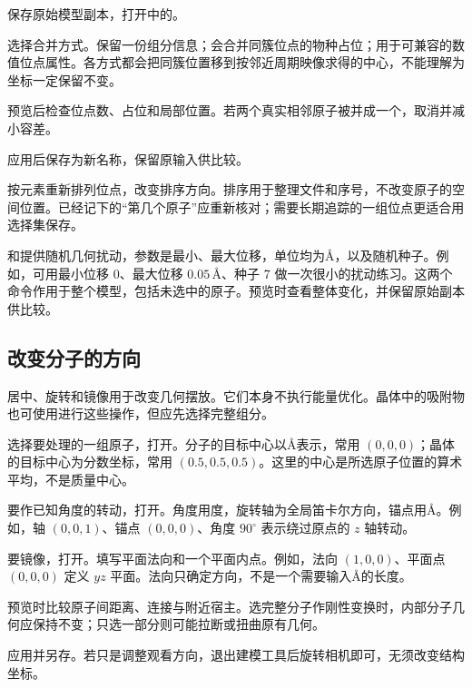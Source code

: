 \begin{steps}
  \item 保存原始模型副本，打开中的。
  \item 选择合并方式。保留一份组分信息；会合并同簇位点的物种占位；用于可兼容的数值位点属性。各方式都会把同簇位置移到按邻近周期映像求得的中心，不能理解为坐标一定保留不变。
  \item 预览后检查位点数、占位和局部位置。若两个真实相邻原子被并成一个，取消并减小容差。
  \item 应用后保存为新名称，保留原输入供比较。
\end{steps}

按元素重新排列位点，改变排序方向。排序用于整理文件和序号，不改变原子的空间位置。已经记下的“第几个原子”应重新核对；需要长期追踪的一组位点更适合用选择集保存。

和提供随机几何扰动，参数是最小、最大位移，单位均为\AA，以及随机种子。例如，可用最小位移 0、最大位移 $0.05\,\text{\AA}$、种子 7 做一次很小的扰动练习。这两个命令作用于整个模型，包括未选中的原子。预览时查看整体变化，并保留原始副本供比较。

\subsection{改变分子的方向}\label{sec:orientation-reference}

居中、旋转和镜像用于改变几何摆放。它们本身不执行能量优化。晶体中的吸附物也可使用进行这些操作，但应先选择完整组分。



\begin{steps}
  \item 选择要处理的一组原子，打开。分子的目标中心以\AA 表示，常用 \((0,0,0)\)；晶体的目标中心为分数坐标，常用 \((0.5,0.5,0.5)\)。这里的中心是所选原子位置的算术平均，不是质量中心。
  \item 要作已知角度的转动，打开。角度用度，旋转轴为全局笛卡尔方向，锚点用\AA。例如，轴 \((0,0,1)\)、锚点 \((0,0,0)\)、角度 $90^\circ$ 表示绕过原点的 $z$ 轴转动。
  \item 要镜像，打开。填写平面法向和一个平面内点。例如，法向 \((1,0,0)\)、平面点 \((0,0,0)\) 定义 $yz$ 平面。法向只确定方向，不是一个需要输入\AA 的长度。
  \item 预览时比较原子间距离、连接与附近宿主。选完整分子作刚性变换时，内部分子几何应保持不变；只选一部分则可能拉断或扭曲原有几何。
  \item 应用并另存。若只是调整观看方向，退出建模工具后旋转相机即可，无须改变结构坐标。
\end{steps}

